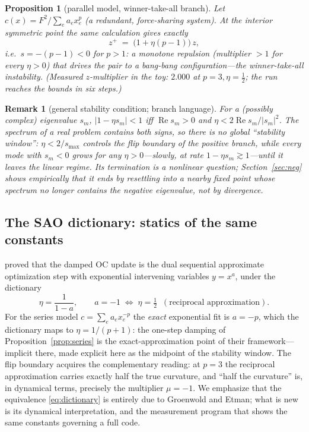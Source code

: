 \documentclass[11pt,a4paper]{article}
\newtheorem{proposition}{Proposition}
\newtheorem{remark}{Remark}
\newcommand{\smax}{s_{\max}}
\begin{document}
\begin{proposition}[parallel model, winner-take-all branch]\label{prop:parallel}
Let $c(x)=F^2/\sum_e a_e x_e^{p}$ (a redundant, force-sharing system).
At the interior symmetric point the same calculation gives exactly
\begin{equation}
  z^{+} \;=\; \bigl(1+\eta(p-1)\bigr)\,z ,
  \label{eq:parallel}
\end{equation}
i.e.\ $s=-(p-1)<0$ for $p>1$: a monotone repulsion (multiplier $>1$ for
every $\eta>0$) that drives the pair to a bang-bang configuration---the
winner-take-all instability. (Measured $z$-multiplier in the toy: $2.000$
at $p=3,\eta=\tfrac12$; the run reaches the bounds in six steps.)
\end{proposition}

\begin{remark}[general stability condition; branch language]\label{rem:branches}
For a (possibly complex) eigenvalue $s_m$, $|1-\eta s_m|<1$ iff
$\operatorname{Re}s_m>0$ and $\eta<2\operatorname{Re}s_m/|s_m|^2$. The
spectrum of a real problem contains both signs, so there is no global
``stability window'': $\eta<2/\smax$ controls the \emph{flip boundary of
the positive branch}, while every mode with $s_m<0$ grows for any
$\eta>0$---slowly, at rate $1-\eta s_m\gtrsim1$---until it leaves the
linear regime. Its termination is a nonlinear question; Section~\ref{sec:neg}
shows empirically that it ends by resettling into a nearby fixed point
whose spectrum no longer contains the negative eigenvalue, not by
divergence.
\end{remark}

\subsection{The SAO dictionary: statics of the same constants}
\label{sec:sao}

\citet{groenwold2008} proved that the damped OC update is the dual
sequential approximate optimization step with exponential intervening
variables $y=x^{a}$, under the dictionary
\begin{equation}
  \eta=\frac{1}{1-a},
  \qquad
  a = -1 \;\Leftrightarrow\; \eta=\tfrac12
  \;\;(\text{reciprocal approximation}).
  \label{eq:dictionary}
\end{equation}
For the series model $c=\sum_e a_e x_e^{-p}$ the \emph{exact} exponential
fit is $a=-p$, which the dictionary maps to $\eta=1/(p+1)$: the one-step
damping of Proposition~\ref{prop:series} is the exact-approximation point
of their framework---implicit there, made explicit here as the midpoint of
the stability window. The flip boundary acquires the complementary
reading: at $p=3$ the reciprocal approximation carries exactly half the
true curvature, and ``half the curvature'' is, in dynamical terms,
precisely the multiplier $\mu=-1$. We emphasize that the equivalence
\eqref{eq:dictionary} is entirely due to Groenwold and Etman; what is new
is its dynamical interpretation, and the measurement program that shows
the same constants governing a full code.
\end{document}
